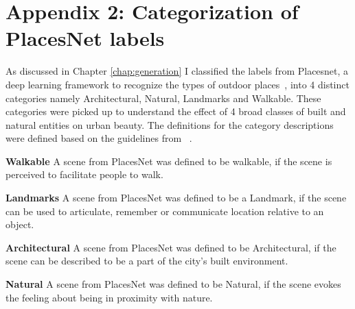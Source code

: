 \chapter{Appendix 2: Categorization of PlacesNet labels}
\label{chap:app2}
As discussed in Chapter \ref{chap:generation} I classified the labels from Placesnet, a deep learning framework to recognize the types of outdoor places~\cite{zhou2014learning}, into 4 distinct categories namely Architectural, Natural, Landmarks and Walkable. These categories were picked up to understand the effect of 4 broad classes of built and natural entities on urban beauty. The definitions for the category descriptions were defined based on the guidelines from ~\cite{ewing2013measuring}.

\begin{definition}
    \textbf{Walkable} A scene from PlacesNet was defined to be walkable, if the scene is perceived to facilitate people to walk.
\end{definition}

\begin{definition}
    \textbf{Landmarks} A scene from PlacesNet was defined to be a Landmark, if the scene can be used to articulate, remember or communicate location relative to an object.
\end{definition}

\begin{definition}
    \textbf{Architectural} A scene from PlacesNet was defined to be Architectural, if the scene can be described to be a part of the city's built environment.
\end{definition}

\begin{definition}
    \textbf{Natural} A scene from PlacesNet was defined to be Natural, if the scene evokes the feeling about being in proximity with nature.
\end{definition}

